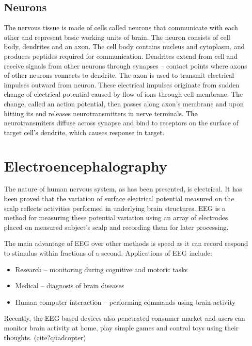 \subsection{Neurons}
The nervous tissue is made of cells called neurons that communicate with each
other and represent basic working units of brain. The neuron consists of cell
body, dendrites and an axon. The cell body contains nucleus and cytoplasm, and
produces peptides required for communication. Dendrites extend from cell and
receive signals from other neurons through synapses -- contact points where
axons of other neurons connects to dendrite. The axon is used to transmit
electrical impulses outward from neuron. These electrical impulses originate
from sudden change of electrical potential caused by flow of ions through cell
membrane. The change, called an action potential, then passes along axon's
membrane and upon hitting its end releases neurotransmitters in nerve terminals.
The neurotransmiters diffuse across synapse and bind to receptors on the surface
of target cell's dendrite, which causes response in target.\cite{brainFacts}


\section{Electroencephalography}
The nature of human nervous system, as has been presented, is electrical. It has
been proved that the variation of surface electrical potential measured on the
scalp reflects activities performed in underlying brain structures. EEG is a
method for measuring these potential variation using an array of electrodes
placed on measured subject's scalp and recording them for later processing.
\cite{eegClass}

The main advantage of EEG over other methods is speed as it can record respond
to stimulus within fractions of a second. \cite{eegFund} Applications of EEG
include:
\begin{itemize}
  \item Research -- monitoring during cognitive and motoric tasks
  \item Medical -- diagnosis of brain diseases
  \item Human computer interaction -- performing commands using brain activity  
\end{itemize}
Recently, the EEG based devices also penetrated consumer market and users can
monitor brain activity at home, play simple games and control toys using
their thoughts. (cite?quadcopter)

